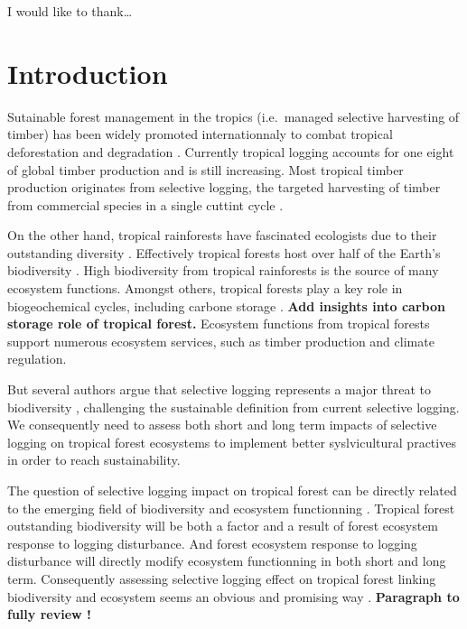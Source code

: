 \documentclass[]{article}
\theoremstyle{definition}
\theoremstyle{definition}
\theoremstyle{remark}
\begin{document}
I would like to thank\ldots{}

\section*{Introduction}\label{introduction}

Sutainable forest management in the tropics (i.e.~managed selective
harvesting of timber) has been widely promoted internationnaly to combat
tropical deforestation and degradation \citep{Zimmerman2012}. Currently
tropical logging accounts for one eight of global timber production
\citep{Blaser2011} and is still increasing. Most tropical timber
production originates from selective logging, the targeted harvesting of
timber from commercial species in a single cuttint cycle
\citep{Martin2015}.

On the other hand, tropical rainforests have fascinated ecologists due
to their outstanding diversity \citep{connell_diversity_1978}.
Effectively tropical forests host over half of the Earth's biodiversity
\citep{Scheffers2012}. High biodiversity from tropical rainforests is
the source of many ecosystem functions. Amongst others, tropical forests
play a key role in biogeochemical cycles, including carbone storage
\citep{Lewis2004}. \textbf{Add insights into carbon storage role of
tropical forest.} Ecosystem functions from tropical forests support
numerous ecosystem services, such as timber production and climate
regulation.

But several authors argue that selective logging represents a major
threat to biodiversity
\citep{Carreno-Rocabado2012, DeAvila2015, Gibson2013, Martin2015, Zimmerman2012},
challenging the sustainable definition from current selective logging.
We consequently need to assess both short and long term impacts of
selective logging on tropical forest ecosystems to implement better
syslvicultural practives in order to reach sustainability.

The question of selective logging impact on tropical forest can be
directly related to the emerging field of biodiversity and ecosystem
functionning \citep{Loreau2000}. Tropical forest outstanding
biodiversity will be both a factor and a result of forest ecosystem
response to logging disturbance. And forest ecosystem response to
logging disturbance will directly modify ecosystem functionning in both
short and long term. Consequently assessing selective logging effect on
tropical forest linking biodiversity and ecosystem seems an obvious and
promising way \citep{Loreau2010}. \textbf{Paragraph to fully review !}
\end{document}
